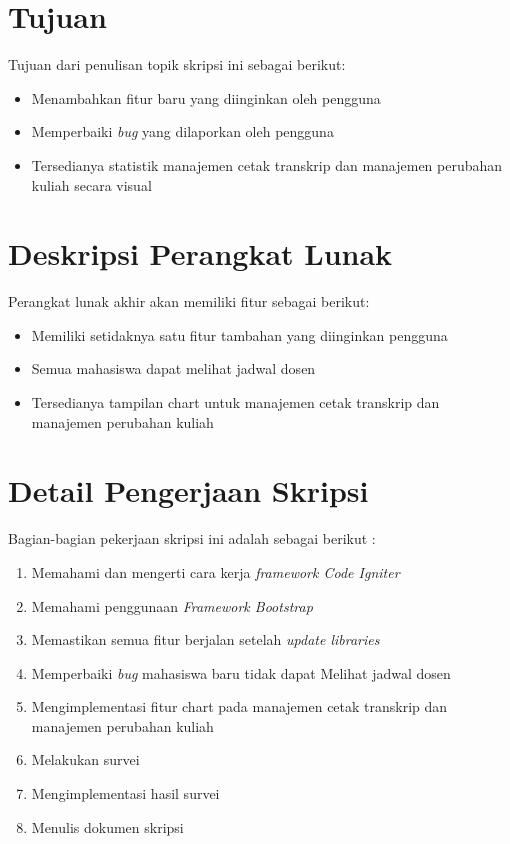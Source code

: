 \documentclass[a4paper,twoside]{article}
\begin{document}
\section{Tujuan}
Tujuan dari penulisan topik skripsi ini sebagai berikut:
\begin{itemize}
	\item Menambahkan fitur baru yang diinginkan oleh pengguna
	\item Memperbaiki \textit{bug} yang dilaporkan oleh pengguna
	\item Tersedianya statistik manajemen cetak transkrip dan manajemen perubahan kuliah secara visual
\end{itemize}

\section{Deskripsi Perangkat Lunak}

Perangkat lunak akhir akan memiliki fitur sebagai berikut:
\begin{itemize}
	\item Memiliki setidaknya satu fitur tambahan yang diinginkan pengguna
	\item Semua mahasiswa dapat melihat jadwal dosen
	\item Tersedianya tampilan chart untuk manajemen cetak transkrip dan manajemen perubahan kuliah
	
\end{itemize}

\section{Detail Pengerjaan Skripsi}

Bagian-bagian pekerjaan skripsi ini adalah sebagai berikut :
	\begin{enumerate}
		\item Memahami dan mengerti cara kerja \textit{framework Code Igniter}
		\item Memahami penggunaan \textit{Framework Bootstrap}
		\item Memastikan semua fitur berjalan setelah \textit{update libraries} 
		\item Memperbaiki \textit{bug} mahasiswa baru tidak dapat Melihat jadwal dosen
		\item Mengimplementasi fitur chart pada manajemen cetak transkrip dan manajemen perubahan kuliah
		\item Melakukan survei
		\item Mengimplementasi hasil survei		
		\item Menulis dokumen skripsi
	\end{enumerate}
\end{document}
